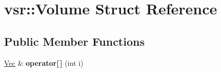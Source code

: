\hypertarget{structvsr_1_1_volume}{\section{vsr\-:\-:Volume Struct Reference}
\label{structvsr_1_1_volume}
}
\subsection*{Public Member Functions}
\begin{DoxyCompactItemize}
\item 
\hypertarget{structvsr_1_1_volume_af7162e8ed5ccbc7b848c3196be1c1950}{\hyperlink{namespacevsr_a0d061c30ac198a710a1b92dd8b343273}{Vec} \& {\bfseries operator\mbox{[}$\,$\mbox{]}} (int i)}\label{structvsr_1_1_volume_af7162e8ed5ccbc7b848c3196be1c1950}

\end{DoxyCompactItemize}
